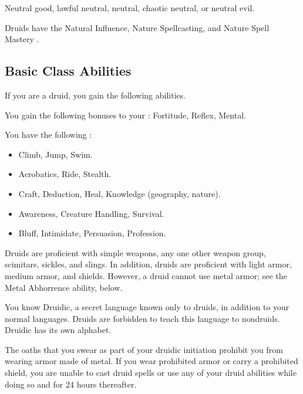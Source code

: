      Neutral good, lawful neutral, neutral, chaotic neutral, or neutral evil.

     Druids have the Natural Influence, Nature Spellcasting, and Nature Spell Mastery .

    \subsection{Basic Class Abilities}
        If you are a druid, you gain the following abilities.

        You gain the following bonuses to your :  Fortitude,  Reflex,  Mental.

        You have the following :
        \begin{itemize}
            \item {} Climb, Jump, Swim.
            \item {} Acrobatics, Ride, Stealth.
            \item {} Craft, Deduction, Heal, Knowledge (geography, nature).
            \item {} Awareness, Creature Handling, Survival.
            \item {} Bluff, Intimidate, Persuasion, Profession.
        \end{itemize}

        Druids are proficient with simple weapons, any one other weapon group, scimitars, sickles, and slings.
        In addition, druids are proficient with light armor, medium armor, and shields.
        However, a druid cannot use metal armor; see the Metal Abhorrence ability, below.

        You know Druidic, a secret language known only to druids, in addition to your normal languages.
        Druids are forbidden to teach this language to nondruids.
        Druidic has its own alphabet.

        The oaths that you swear as part of your druidic initiation prohibit you from wearing armor made of metal.
        If you wear prohibited armor or carry a prohibited shield, you are unable to cast druid spells or use any of your  druid abilities while doing so and for 24 hours thereafter.

